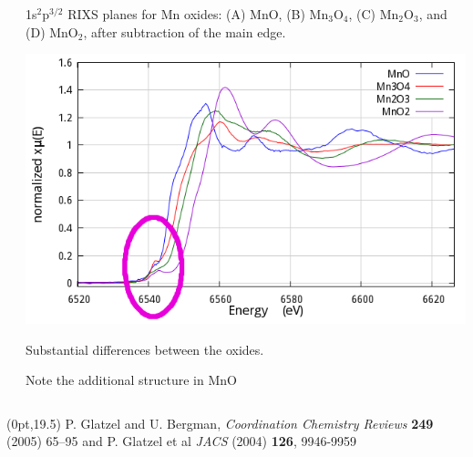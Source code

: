 \documentclass[10pt, xcolor=x11names, compress]{beamer}
\begin{document}
\begin{frame}
\begin{columns}[T]
\begin{column}{0.3\linewidth}
\begin{center}
      \end{center}
    \end{column}
    \begin{column}{0.7\linewidth}
      1s$^2$p$^{3/2}$ RIXS planes for Mn oxides: (A) MnO, (B)
      Mn$_3$O$_4$, (C) Mn$_2$O$_3$, and (D) MnO$_2$, after subtraction
      of the main edge.

      \begin{center}
        \includegraphics[width=0.7\linewidth]{pses/XES/mn_oxides_xas.png}
      \end{center}

      Substantial differences between the oxides.

      \bigskip

      Note the additional structure in MnO

    \end{column}
  \end{columns}
  \begin{textblock*}{0.6\linewidth}(0pt,19.5\TPVertModule) \tiny
    P. Glatzel and U. Bergman, \textit{Coordination Chemistry Reviews}
    \textbf{249} (2005) 65–95 and P. Glatzel et al \textit{JACS}
    (2004) \textbf{126}, 9946-9959
  \end{textblock*}
\end{frame}
\end{document}
